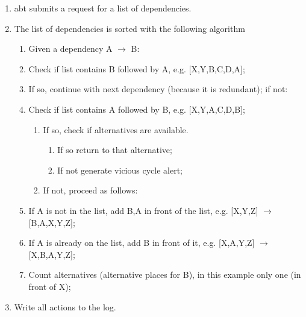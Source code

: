  \begin{enumerate}
   \item abt submits a request for a list of dependencies.
   \item The list of dependencies is sorted with the following algorithm
    \begin{enumerate}
     \item Given a dependency A \begin{math} \rightarrow \end{math} B:
     \item Check if list contains B followed by A, e.g. [X,Y,B,C,D,A];
     \item If so, continue with next dependency (because it is redundant); if not:
     \item Check if list contains A followed by B, e.g. [X,Y,A,C,D,B];
      \begin{enumerate}
       \item If so, check if alternatives are available. 
        \begin{enumerate}
         \item If so return to that alternative; 
         \item If not generate vicious cycle alert;
        \end{enumerate}
        \item If not, proceed as follows:
      \end{enumerate}
     \item If A is not in the list, add B,A in front of the list, e.g. [X,Y,Z] \begin{math} \rightarrow \end{math} [B,A,X,Y,Z];
     \item If A is already on the list, add B in front of it, e.g. [X,A,Y,Z] \begin{math} \rightarrow \end{math} [X,B,A,Y,Z];
     \item Count alternatives (alternative places for B), in this example only one (in front of X); 
    \end{enumerate}
    \item Write all actions to the log.
  \end{enumerate}
 